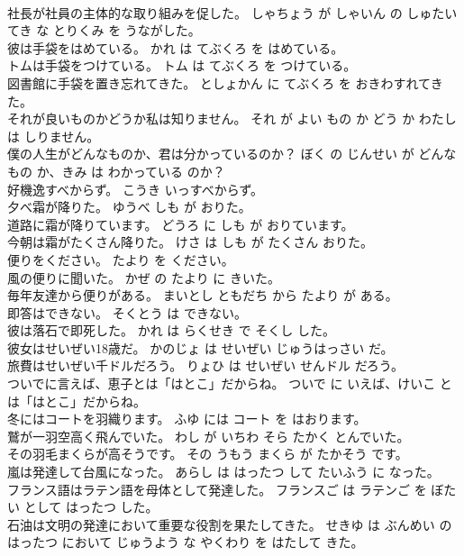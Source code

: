 \documentclass[8pt]{extreport}
\begin{document}
\begin{CJK}{UTF8}{min}
\\	社長が社員の主体的な取り組みを促した。	しゃちょう が しゃいん の しゅたいてき な とりくみ を うながした。	
\\	彼は手袋をはめている。	かれ は てぶくろ を はめている。	
\\	トムは手袋をつけている。	トム は てぶくろ を つけている。	
\\	図書館に手袋を置き忘れてきた。	としょかん に てぶくろ を おきわすれてきた。	
\\	それが良いものかどうか私は知りません。	それ が よい もの か どう か わたし は しりません。	
\\	僕の人生がどんなものか、君は分かっているのか？	ぼく の じんせい が どんな もの か、きみ は わかっている のか？	
\\	好機逸すべからず。	こうき いっすべからず。	
\\	夕べ霜が降りた。	ゆうべ しも が おりた。	
\\	道路に霜が降りています。	どうろ に しも が おりています。	
\\	今朝は霜がたくさん降りた。	けさ は しも が たくさん おりた。	
\\	便りをください。	たより を ください。	
\\	風の便りに聞いた。	かぜ の たより に きいた。	
\\	毎年友達から便りがある。	まいとし ともだち から たより が ある。	
\\	即答はできない。	そくとう は できない。	
\\	彼は落石で即死した。	かれ は らくせき で そくし した。	
\\	彼女はせいぜい18歳だ。	かのじょ は せいぜい じゅうはっさい だ。	
\\	旅費はせいぜい千ドルだろう。	りょひ は せいぜい せんドル だろう。	
\\	ついでに言えば、恵子とは「はとこ」だからね。	ついで に いえば、けいこ とは「はとこ」だからね。	
\\	冬にはコートを羽織ります。	ふゆ には コート を はおります。	
\\	鷲が一羽空高く飛んでいた。	わし が いちわ そら たかく とんでいた。	
\\	その羽毛まくらが高そうです。	その うもう まくら が たかそう です。	
\\	嵐は発達して台風になった。	あらし は はったつ して たいふう に なった。	
\\	フランス語はラテン語を母体として発達した。	フランスご は ラテンご を ぼたい として はったつ した。	
\\	石油は文明の発達において重要な役割を果たしてきた。	せきゆ は ぶんめい の はったつ において じゅうよう な やくわり を はたして きた。	

\end{CJK}
\end{document}
